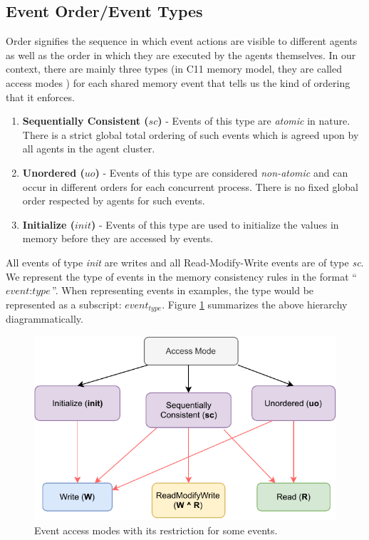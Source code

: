     \subsection{Event Order/Event Types} 
        Order signifies the sequence in which event actions are visible to different agents as well as the order in which they are executed by the agents themselves. 
        In our context, there are mainly three types (in C11 memory model, they are called access modes \cite{C11MM}) for each shared memory event that tells us the kind of ordering that it enforces. 
        \begin{enumerate}
            \item \textbf{Sequentially Consistent ($sc$)} - Events of this type are \textit{atomic} in nature\footnotemark. There is a strict global total ordering of such events which is agreed upon by all agents in the agent cluster. 
            
            \item \textbf{Unordered ($uo$)} - Events of this type are considered \textit{non-atomic} and can occur in different orders for each concurrent process. There is no fixed global order respected by agents for such events. 
            
            \item \textbf{Initialize ($init$)} - Events of this type are used to initialize the values in memory before they are accessed by events. 
        \end{enumerate}

        All events of type \textit{init} are writes and all Read-Modify-Write events are of type \textit{sc}.  
        We represent the type of events in the memory consistency rules in the format ``$\textit{event} : \textit{type}$''. 
        When representing events in examples, the type would be represented as a subscript: $\textit{event}_\textit{type}$. 
        Figure \ref{model:event_types} summarizes the above hierarchy diagrammatically.
        \begin{figure}[H]
            \centering
            \includegraphics[scale=0.7]{3.ECMAScriptMemoryModel/AccessModes.pdf}
            \caption{Event access modes with its restriction for some events.}
            \label{model:event_types}
        \end{figure}

